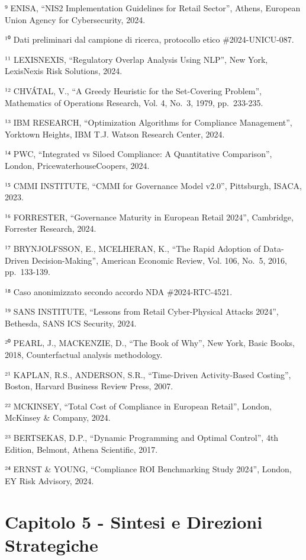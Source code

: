 \documentclass[12pt,a4paper,oneside]{book}
\numberwithin{figure}{chapter} %
\numberwithin{table}{chapter}  %
\begin{document}
⁹ ENISA, ``NIS2 Implementation Guidelines for Retail Sector'', Athens,
European Union Agency for Cybersecurity, 2024.

¹⁰ Dati preliminari dal campione di ricerca, protocollo etico
\#2024-UNICU-087.

¹¹ LEXISNEXIS, ``Regulatory Overlap Analysis Using NLP'', New York,
LexisNexis Risk Solutions, 2024.

¹² CHVÁTAL, V., ``A Greedy Heuristic for the Set-Covering Problem'',
Mathematics of Operations Research, Vol. 4, No.~3, 1979, pp.~233-235.

¹³ IBM RESEARCH, ``Optimization Algorithms for Compliance Management'',
Yorktown Heights, IBM T.J. Watson Research Center, 2024.

¹⁴ PWC, ``Integrated vs Siloed Compliance: A Quantitative Comparison'',
London, PricewaterhouseCoopers, 2024.

¹⁵ CMMI INSTITUTE, ``CMMI for Governance Model v2.0'', Pittsburgh,
ISACA, 2023.

¹⁶ FORRESTER, ``Governance Maturity in European Retail 2024'',
Cambridge, Forrester Research, 2024.

¹⁷ BRYNJOLFSSON, E., MCELHERAN, K., ``The Rapid Adoption of Data-Driven
Decision-Making'', American Economic Review, Vol. 106, No.~5, 2016,
pp.~133-139.

¹⁸ Caso anonimizzato secondo accordo NDA \#2024-RTC-4521.

¹⁹ SANS INSTITUTE, ``Lessons from Retail Cyber-Physical Attacks 2024'',
Bethesda, SANS ICS Security, 2024.

²⁰ PEARL, J., MACKENZIE, D., ``The Book of Why'', New York, Basic Books,
2018, Counterfactual analysis methodology.

²¹ KAPLAN, R.S., ANDERSON, S.R., ``Time-Driven Activity-Based Costing'',
Boston, Harvard Business Review Press, 2007.

²² MCKINSEY, ``Total Cost of Compliance in European Retail'', London,
McKinsey \& Company, 2024.

²³ BERTSEKAS, D.P., ``Dynamic Programming and Optimal Control'', 4th
Edition, Belmont, Athena Scientific, 2017.

²⁴ ERNST \& YOUNG, ``Compliance ROI Benchmarking Study 2024'', London,
EY Risk Advisory, 2024.

\chapter{Capitolo 5 - Sintesi e Direzioni
Strategiche}\label{capitolo-5---sintesi-e-direzioni-strategiche}
\end{document}
